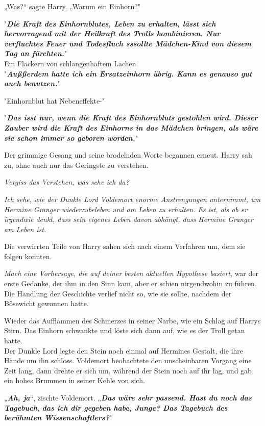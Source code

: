 {„Was?“ sagte Harry. „Warum ein Einhorn?"

"\textbf{\emph{Die Kraft des Einhornblutes, Leben zu erhalten, lässt sich hervorragend mit der Heilkraft des Trolls kombinieren. Nur verfluchtes Feuer und Todesfluch sssollte Mädchen-Kind von diesem Tag an fürchten.}}"\\ Ein Flackern von schlangenhaftem Lachen.\\ "\textbf{\emph{Außßerdem hatte ich ein Ersatzeinhorn übrig. Kann es genauso gut auch benutzen.}}"

"Einhornblut hat Nebeneffekte-"

"\textbf{\emph{Das isst nur, wenn die Kraft des Einhornbluts gestohlen wird. Dieser Zauber wird die Kraft des Einhorns in das Mädchen bringen, als wäre sie schon immer so geboren worden.}}"

Der grimmige Gesang und seine brodelnden Worte begannen erneut. Harry sah zu, ohne auch nur das Geringste zu verstehen.

\emph{Vergiss das Verstehen, was sehe ich da?}

\emph{Ich sehe, wie der Dunkle Lord Voldemort enorme Anstrengungen unternimmt, um Hermine Granger wiederzubeleben und am Leben zu erhalten. Es ist, als ob er irgendwie denkt, dass sein eigenes Leben davon abhängt, dass Hermine Granger am Leben ist.}

Die verwirrten Teile von Harry sahen sich nach einem Verfahren um, dem sie folgen konnten.

\emph{Mach eine Vorhersage, die auf deiner besten aktuellen Hypothese basiert}, war der erste Gedanke, der ihm in den Sinn kam, aber er schien nirgendwohin zu führen.\\ Die Handlung der Geschichte verlief nicht so, wie sie sollte, nachdem der Bösewicht gewonnen hatte.

Wieder das Aufflammen des Schmerzes in seiner Narbe, wie ein Schlag auf Harrys Stirn. Das Einhorn schwankte und löste sich dann auf, wie es der Troll getan hatte.\\ Der Dunkle Lord legte den Stein noch einmal auf Hermines Gestalt, die ihre Hände um ihn schloss. Voldemort beobachtete den unscheinbaren Vorgang eine Zeit lang, dann drehte er sich um, während der Stein noch auf ihr lag, und gab ein hohes Brummen in seiner Kehle von sich.

„\textbf{\emph{Ah, ja}}“, zischte Voldemort. „\textbf{\emph{Das wäre sehr passend. Hast du noch das Tagebuch,}} \textbf{\emph{das ich dir gegeben habe, Junge? Das Tagebuch des berühmten Wissenschaftlers?}}"

}
